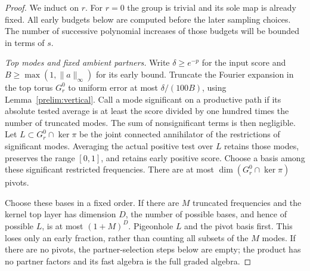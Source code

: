 \begin{proof}
We induct on $r$.  For $r=0$ the group is trivial and its sole map
is already fixed.  All early budgets below are computed before the
later sampling choices.  The number of successive polynomial
increases of those budgets will be bounded in terms of $s$.

\emph{Top modes and fixed ambient partners.}
Write $\delta\ge e^{-p}$ for the input score and
$B\ge\max(1,\|a\|_\infty)$ for its early bound.  Truncate the Fourier
expansion in the top torus $G^0_r$ to uniform error at most
$\delta/(100B)$, using Lemma~\ref{prelim:vertical}.  Call a mode
significant on a productive path if its absolute tested average is
at least the score divided by one hundred times the number of
truncated modes.  The sum of nonsignificant terms is then negligible.
Let $L\subset G^0_r\cap\ker\pi$ be the joint connected annihilator
of the restrictions of significant modes.  Averaging the actual
positive test over $L$ retains those modes, preserves the range
$[0,1]$, and retains early positive score.  Choose a basis among
these significant restricted frequencies.  There are at most
$\dim(G^0_r\cap\ker\pi)$ pivots.

Choose these bases in a fixed order.  If there are $M$ truncated
frequencies and the kernel top layer has dimension $D$, the number
of possible bases, and hence of possible $L$, is at most $(1+M)^D$.
Pigeonhole $L$ and the pivot basis first.  This loses only an early
fraction, rather than counting all subsets of the $M$ modes.
If there are no pivots, the partner-selection steps below are empty;
the product has no partner factors and its fast algebra is the full
graded algebra.


\end{proof}
